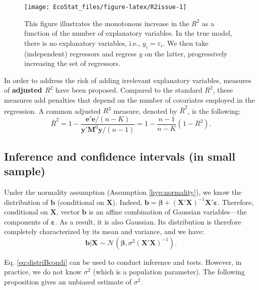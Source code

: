 \documentclass[
  12pt,
]{book}
\theoremstyle{definition}
\theoremstyle{definition}
\theoremstyle{definition}
\theoremstyle{definition}
\theoremstyle{remark}
\begin{document}
\begin{figure}
\texttt{[image: EcoStat\_files/figure-latex/R2issue-1]} \caption{This figure illustrates the monotonous increase in the $R^2$ as a function of the number of explanatory variables. In the true model, there is no explanatory variables, i.e., $y_i = \varepsilon_i$. We then take (independent) regressors and regress $y$ on the latter, progressively increasing the set of regressors.}\label{fig:R2issue}
\end{figure}

In order to address the risk of adding irrelevant explanatory variables, measures of \textbf{adjusted \(R^2\)} have been proposed. Compared to the standard \(R^2\), these measures add penalties that depend on the number of covariates employed in the regression. A common adjusted \(R^2\) measure, denoted by \(\bar{R}^2\), is the following:
\begin{equation*}
\boxed{\bar{R}^2 = 1 - \frac{\mathbf{e}'\mathbf{e}/(n-K)}{\mathbf{y}'\mathbf{M}^0\mathbf{y}/(n-1)} = 1 - \frac{n-1}{n-K}(1-R^2).}
\end{equation*}

\hypertarget{inference-and-confidence-intervals-in-small-sample}{%
\subsection{Inference and confidence intervals (in small sample)}\label{inference-and-confidence-intervals-in-small-sample}}

Under the normality assumption (Assumption \ref{hyp:normality}), we know the distribution of \(\mathbf{b}\) (conditional on \(\mathbf{X}\)). Indeed, \(\mathbf{b} = \boldsymbol\beta + (\mathbf{X}'\mathbf{X})^{-1} \mathbf{X}'\boldsymbol\varepsilon\). Therefore, conditional on \(\mathbf{X}\), vector \(\mathbf{b}\) is an affine combination of Gaussian variables---the components of \(\boldsymbol\varepsilon\). As a result, it is also Gaussian. Its distribution is therefore completely characterized by its mean and variance, and we have:
\begin{equation}
\mathbf{b}|\mathbf{X} \sim \mathcal{N}(\boldsymbol\beta,\sigma^2(\mathbf{X}'\mathbf{X})^{-1}).\label{eq:distriBcondi}
\end{equation}

Eq. \eqref{eq:distriBcondi} can be used to conduct inference and tests. However, in practice, we do not know \(\sigma^2\) (which is a population parameter). The following proposition gives an unbiased estimate of \(\sigma^2\).
\end{document}
